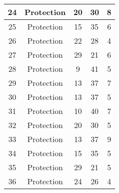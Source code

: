 \documentclass[results.tex]{subfiles}
\begin{document}
\begin{center}
\begin{tabular}{| c || c | c | c | c |}
            \hline
            24                      & Protection                   & 20                     & 30                      & 8                    \\
            \hline
            25                      & Protection                   & 15                     & 35                      & 6                    \\
            \hline
            26                      & Protection                   & 22                     & 28                      & 4                    \\
            \hline
            27                      & Protection                   & 29                     & 21                      & 6                    \\
            \hline
            28                      & Protection                   & 9                      & 41                      & 5                    \\
            \hline
            29                      & Protection                   & 13                     & 37                      & 7                    \\
            \hline
            30                      & Protection                   & 13                     & 37                      & 5                    \\
            \hline
            31                      & Protection                   & 10                     & 40                      & 7                    \\
            \hline
            32                      & Protection                   & 20                     & 30                      & 5                    \\
            \hline
            33                      & Protection                   & 13                     & 37                      & 9                    \\
            \hline
            34                      & Protection                   & 15                     & 35                      & 5                    \\
            \hline
            35                      & Protection                   & 29                     & 21                      & 5                    \\
            \hline
            36                      & Protection                   & 24                     & 26                      & 4                    \\

\end{tabular}
\end{center}
\end{document}
